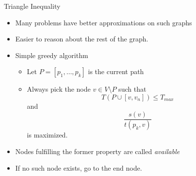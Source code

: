 \begin{frame}{Triangle Inequality}


	\begin{itemize}
		\item<2-> Many problems have better approximations on such graphs \cite{black_triangle_2004}
		\item<2-> Easier to reason about the rest of the graph.
		\item<3-> Simple greedy algorithm \begin{itemize}
			\item<4-> Let $P = [p_1, \dots, p_k]$ is the current path
			\item<4-> Always pick the node $v \in V \setminus P$ such that
			\begin{equation*}
				T(P \cup [v, v_n]) \leq T_{max}
			\end{equation*}
			and
			\begin{equation*}
				\frac{s(v)}{t(p_k, v)}
			\end{equation*}
			is maximized.
		\end{itemize}
		\item<3-> Nodes fulfilling the former property are called \emph{available}
		\item<4-> If no such node exists, go to the end node.
	\end{itemize}
\end{frame}

